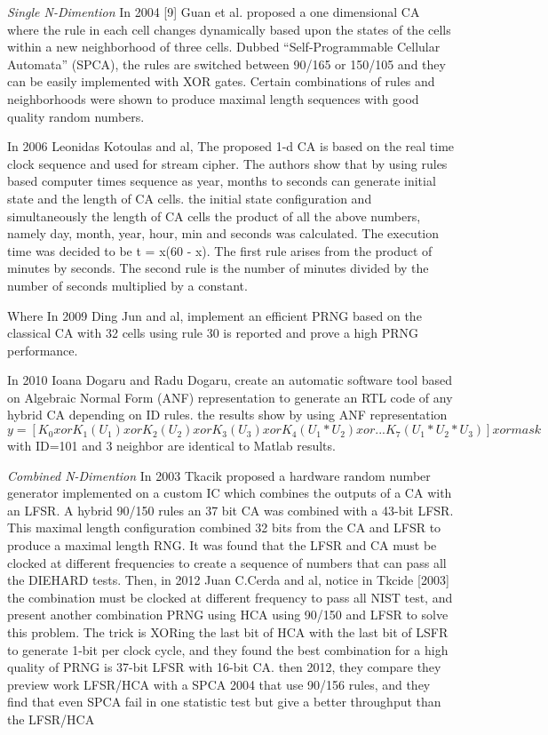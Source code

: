 %
\textit{Single N-Dimention}
In 2004 [9] Guan et al. proposed a one dimensional CA where the rule in each cell changes dynamically based upon the states of the cells within a new neighborhood of three cells. Dubbed “Self-Programmable Cellular Automata” (SPCA), the rules are switched between 90/165 or 150/105 and they can be easily implemented with XOR gates. Certain combinations of rules and neighborhoods were shown to produce maximal length sequences with good quality random numbers.

In 2006 Leonidas Kotoulas and al, The proposed 1-d CA is based on the real time clock sequence and used for stream cipher. The authors show that by using rules based computer times sequence as year, months to seconds can generate initial state and the length of CA cells. the initial state configuration and simultaneously the length of CA cells the product of all the above numbers, namely day, month, year, hour, min and seconds was calculated. The execution time was decided to be t = x(60 - x). The first rule arises from the product of minutes by seconds. The second rule is the number of minutes divided by the number of seconds multiplied by a constant.

Where In 2009 Ding Jun and al, implement an efficient PRNG based on the classical CA with 32 cells using rule 30 is reported and prove a high PRNG performance. 

In 2010 Ioana Dogaru and Radu Dogaru, create an automatic software tool based on Algebraic Normal Form (ANF) representation to generate an RTL code of any hybrid CA depending on ID rules. the results show by using ANF representation  $y = [K_{0} xor K_{1}(U_{1}) xor K_{2}(U_{2}) xor K_{3}(U_{3}) xor K_{4}(U_{1}*U_{2}) xor ... K_{7}(U_{1}*U_{2}*U_{3})] xor mask$ with ID=101 and 3 neighbor are identical to Matlab results.

\textit{Combined N-Dimention}
In 2003 Tkacik proposed a hardware random number generator implemented on a custom IC which combines the outputs of a CA with an LFSR. A hybrid 90/150 rules an 37 bit CA was combined with a 43-bit LFSR. This maximal length configuration combined 32 bits from the CA and LFSR to produce a maximal length RNG. It was found that the LFSR and CA must be clocked at different frequencies to create a sequence of numbers that can pass all the DIEHARD tests. Then, in 2012 Juan C.Cerda and al, notice in Tkcide [2003] the combination must be clocked at different frequency to pass all NIST test, and present another combination PRNG using HCA using 90/150 and LFSR to solve this problem. The trick is XORing the last bit of HCA with the last bit of LSFR to generate 1-bit per clock cycle, and they found the best combination for a high quality of PRNG is 37-bit LFSR with 16-bit CA. then 2012, they compare they preview work LFSR/HCA with a SPCA 2004 that use 90/156 rules, and they find that even SPCA fail in one statistic test but give a better throughput than the LFSR/HCA


